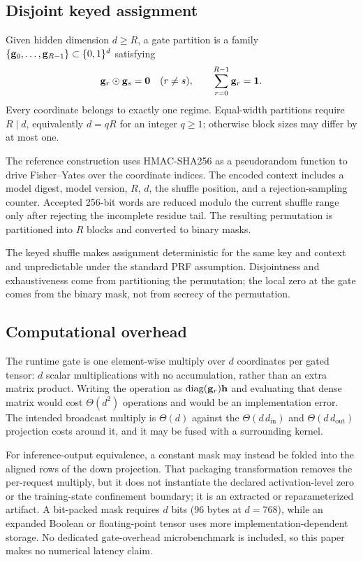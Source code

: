 \documentclass[11pt]{article}
\begin{document}
\subsection{Disjoint keyed assignment}

Given hidden dimension $d\ge R$, a gate partition is a family
$\{\mathbf{g}_0,\ldots,\mathbf{g}_{R-1}\}\subset\{0,1\}^d$ satisfying
\begin{equation}
  \mathbf{g}_r\odot\mathbf{g}_s=\mathbf 0\quad(r\ne s),
  \qquad \sum_{r=0}^{R-1}\mathbf{g}_r=\mathbf 1.
  \label{eq:partition}
\end{equation}
Every coordinate belongs to exactly one regime. Equal-width partitions require
$R\mid d$, equivalently $d=qR$ for an integer $q\ge1$; otherwise block sizes
may differ by at most one.

The reference construction uses HMAC-SHA256 as a pseudorandom function to drive
Fisher--Yates over the coordinate indices. The encoded context includes a model
digest, model version, $R$, $d$, the shuffle position, and a rejection-sampling
counter. Accepted 256-bit words are reduced modulo the current shuffle range
only after rejecting the incomplete residue tail. The resulting permutation is
partitioned into $R$ blocks and converted to binary masks.

The keyed shuffle makes assignment deterministic for the same key and context
and unpredictable under the standard PRF assumption. Disjointness and
exhaustiveness come from partitioning the permutation; the local zero at the
gate comes from the binary mask, not from secrecy of the permutation.

\subsection{Computational overhead}

The runtime gate is one element-wise multiply over $d$ coordinates per gated
tensor: $d$ scalar multiplications with no accumulation, rather than an extra
matrix product. Writing the operation as
$\operatorname{diag}(\mathbf{g}_r)\mathbf{h}$ and evaluating that dense matrix would cost
$\Theta(d^2)$ operations and would be an implementation error. The intended
broadcast multiply is $\Theta(d)$ against the
$\Theta(d\,d_{\mathrm{in}})$ and $\Theta(d\,d_{\mathrm{out}})$ projection
costs around it, and it may be fused with a surrounding kernel.

For inference-output equivalence, a constant mask may instead be folded into
the aligned rows of the down projection. That packaging transformation removes
the per-request multiply, but it does not instantiate the declared
activation-level zero or the training-state confinement boundary; it is an
extracted or reparameterized artifact. A bit-packed mask requires $d$ bits
(96 bytes at $d=768$), while an expanded Boolean or floating-point tensor uses
more implementation-dependent storage. No dedicated gate-overhead
microbenchmark is included, so this paper makes no numerical latency claim.
\end{document}
